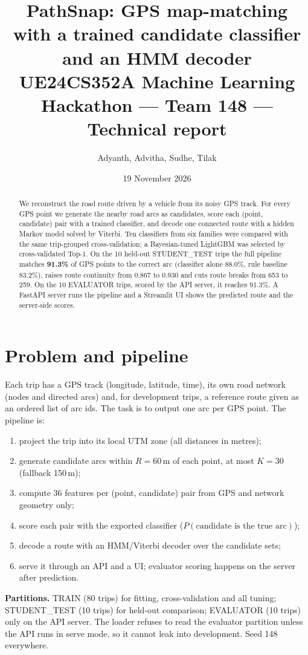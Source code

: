 \documentclass[11pt,a4paper]{article}
\title{\textbf{PathSnap: GPS map-matching with a trained candidate classifier and an HMM decoder}\\[2pt]
\large UE24CS352A Machine Learning Hackathon --- Team 148 --- Technical report}
\author{Adyanth, Advitha, Sudhe, Tilak}
\date{19 November 2026}
\begin{document}
\maketitle

\begin{abstract}
We reconstruct the road route driven by a vehicle from its noisy GPS track. For every GPS point we generate the
nearby road arcs as candidates, score each (point, candidate) pair with a trained classifier, and decode one connected
route with a hidden Markov model solved by Viterbi. Ten classifiers from six families were compared with the same
trip-grouped cross-validation; a Bayesian-tuned LightGBM was selected by cross-validated Top-1. On the 10 held-out
STUDENT\_TEST trips the full pipeline matches \textbf{91.3\%} of GPS points to the correct arc
(classifier alone 88.0\%, rule baseline 83.2\%), raises route continuity from 0.867 to
0.930 and cuts route breaks from 653 to 259. On the 10 EVALUATOR
trips, scored by the API server, it reaches 91.3\%. A FastAPI server runs the pipeline and a Streamlit UI shows the
predicted route and the server-side scores.
\end{abstract}

\section{Problem and pipeline}
Each trip has a GPS track (longitude, latitude, time), its own road network (nodes and directed arcs) and, for
development trips, a reference route given as an ordered list of arc ids. The task is to output one arc per GPS
point. The pipeline is:
\begin{enumerate}\setlength\itemsep{0pt}
\item project the trip into its local UTM zone (all distances in metres);
\item generate candidate arcs within $R=60$\,m of each point, at most $K=30$ (fallback 150\,m);
\item compute 36 features per (point, candidate) pair from GPS and network geometry only;
\item score each pair with the exported classifier ($P(\text{candidate is the true arc})$);
\item decode a route with an HMM/Viterbi decoder over the candidate sets;
\item serve it through an API and a UI; evaluator scoring happens on the server after prediction.
\end{enumerate}
\textbf{Partitions.} TRAIN (80 trips) for fitting, cross-validation and all tuning; STUDENT\_TEST (10 trips) for
held-out comparison; EVALUATOR (10 trips) only on the API server. The loader refuses to read the evaluator partition
unless the API runs in serve mode, so it cannot leak into development. Seed 148 everywhere.
\end{document}
